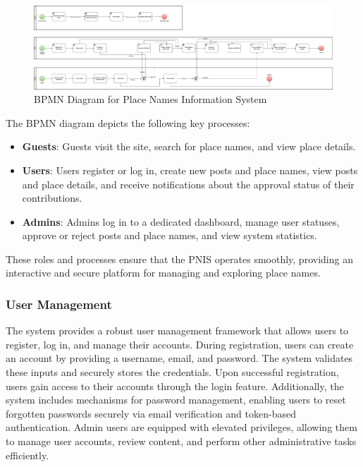 \newpage
\begin{landscape}
\begin{figure}[p]
    \centering
    \includegraphics[width=\linewidth, height=0.8\textheight, keepaspectratio]{bpmn.png}
    \caption{BPMN Diagram for Place Names Information System}
    \label{fig:bpmn}
\end{figure}
\end{landscape}

The BPMN diagram depicts the following key processes:
\begin{itemize}
    \item \textbf{Guests}: Guests visit the site, search for place names, and view place details.
    \item \textbf{Users}: Users register or log in, create new posts and place names, view posts and place details, and receive notifications about the approval status of their contributions.
    \item \textbf{Admins}: Admins log in to a dedicated dashboard, manage user statuses, approve or reject posts and place names, and view system statistics.
\end{itemize}

These roles and processes ensure that the PNIS operates smoothly, providing an interactive and secure platform for managing and exploring place names.
\subsubsection{User Management}
The system provides a robust user management framework that allows users to register, log in, and manage their accounts. During registration, users can create an account by providing a username, email, and password. The system validates these inputs and securely stores the credentials. Upon successful registration, users gain access to their accounts through the login feature. Additionally, the system includes mechanisms for password management, enabling users to reset forgotten passwords securely via email verification and token-based authentication. Admin users are equipped with elevated privileges, allowing them to manage user accounts, review content, and perform other administrative tasks efficiently.

